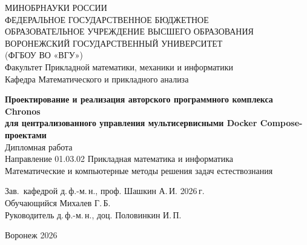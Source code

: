 \documentclass[a4paper,14pt]{extarticle}
\begin{document}
\begin{titlepage}
\thispagestyle{empty}
\begin{center}
\MakeUppercase{Минобрнауки России\\
Федеральное государственное бюджетное \\
образовательное учреждение высшего образования\\
Воронежский государственный университет\\
(ФГБОУ ВО «ВГУ»)}\\
\vspace{10mm}
Факультет Прикладной математики, механики и информатики\\
Кафедра Математического и прикладного анализа\\

\Large
\vspace{20mm}

{\bfseries Проектирование и реализация авторского программного комплекса Chronos\\
для централизованного управления мультисервисными Docker Compose-проектами}\\
\large
\vspace{20mm}
Дипломная работа\\
Направление 01.03.02 Прикладная математика и информатика\\
Математические и компьютерные методы решения задач естествознания
\end{center}

\vspace{20mm}
\noindent
Зав.\ кафедрой \underline{\hspace{1.5in}} д.\,ф.-м.\,н., проф. Шашкин А.\,И.\hfill \underline{\hspace{0.3in}} \underline{\hspace{0.3in}} 2026\,г.\\
Обучающийся \underline{\hspace{1.55in}} Михалев Г.\,Б.\\
Руководитель \underline{\hspace{1.6in}} д.\,ф.-м.\,н., доц. Половинкин И.\,П.

\begin{center}
\vfill
\large
Воронеж 2026
\end{center}

\end{titlepage}
\clearpage

\setcounter{page}{2}
\tableofcontents
\clearpage

\setcounter{page}{1}








\clearpage
\printbibliography[title={Список использованных источников}]

\appendix


\end{document}
